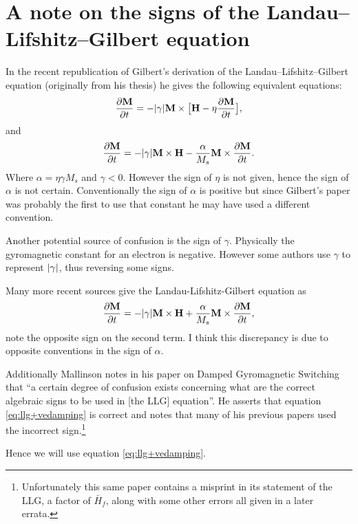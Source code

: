 
\section{A note on the signs of the Landau--Lifshitz--Gilbert equation}
\label{sec:note-signs-llg}

In the recent republication of Gilbert's derivation of the
Landau--Lifshitz--Gilbert equation\cite{Gilbert2004} (originally from his
thesis) he gives the following equivalent equations:
\begin{equation}
  \frac{\partial \mathbf{M}}{\partial t} = - \lvert \gamma \rvert \mathbf{M} \times \big[ \mathbf{H} - \eta \frac{\partial \mathbf{M}}{\partial t} \big],
\end{equation}
and
\begin{equation}
  \frac{\partial \mathbf{M}}{\partial t} = - \lvert \gamma \rvert \mathbf{M} \times \mathbf{H} - \frac{\alpha}{M_s} \mathbf{M} \times \frac{\partial \mathbf{M}}{\partial t}.
  \label{eq:llg-vedamping}
\end{equation}
Where $\alpha = \eta \gamma M_s$ and $\gamma < 0$. However the sign of $\eta$ is not given, hence the sign of $\alpha$ is not certain. Conventionally the sign of $\alpha$ is positive but since Gilbert's paper was probably the first to use that constant he may have used a different convention.

Another potential source of confusion is the sign of $\gamma$. Physically the gyromagnetic constant for an electron is negative. However some authors use $\gamma$ to represent $\lvert \gamma \rvert$, thus reversing some signs.

Many more recent sources\cite{Fidler2000}\cite{nmag-manual}\cite{Lopez-Diaz2012} give the Landau-Lifshitz-Gilbert equation as
\begin{equation}
  \frac{\partial \mathbf{M}}{\partial t} = - \lvert \gamma \rvert \mathbf{M} \times \mathbf{H} + \frac{\alpha}{M_s} \mathbf{M} \times \frac{\partial \mathbf{M}}{\partial t},
  \label{eq:llg+vedamping}
\end{equation}
note the opposite sign on the second term. I think this discrepancy is due to opposite conventions in the sign of $\alpha$.

Additionally Mallinson notes in his paper on Damped Gyromagnetic Switching\cite{Mallinson2000} that ``a certain degree of confusion exists concerning what are the correct algebraic signs to be used in [the LLG] equation''. He asserts that equation \eqref{eq:llg+vedamping} is correct and notes that many of his previous papers used the incorrect sign.\footnote{Unfortunately this same paper contains a misprint in its statement of the LLG, a factor of $\bar{H}_f$, along with some other errors all given in a later errata.}


Hence we will use equation \eqref{eq:llg+vedamping}.





